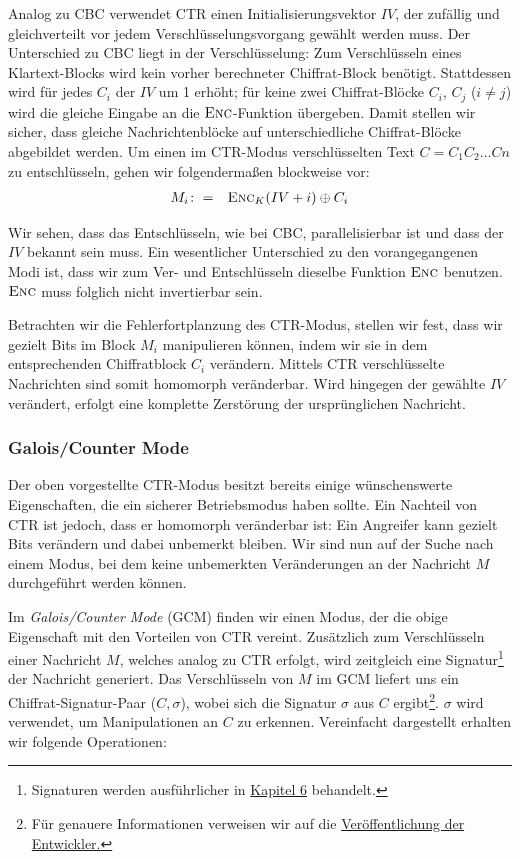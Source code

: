 Analog zu CBC verwendet CTR einen Initialisierungsvektor \(IV\), der zufällig und gleichverteilt vor jedem Verschlüsselungsvorgang gewählt werden muss. Der Unterschied zu CBC liegt in der Verschlüsselung: Zum Verschlüsseln eines Klartext-Blocks wird kein vorher berechneter Chiffrat-Block benötigt. Stattdessen wird für jedes \(C_i\) der \(IV\) um 1 erhöht; für keine zwei Chiffrat-Blöcke \(C_i\), \(C_j\) (\(i \neq j\)) wird die gleiche Eingabe an die \(\textsc{Enc}\)-Funktion übergeben. Damit stellen wir sicher, dass gleiche Nachrichtenblöcke auf unterschiedliche Chiffrat-Blöcke abgebildet werden. Um einen im CTR-Modus verschlüsselten Text \(C = C_1C_2 \dots Cn\) zu entschlüsseln, gehen wir folgendermaßen blockweise vor:
\begin{eqnarray*}
	M_i	& \colon=	& \textsc{Enc}_{K}(IV + i) \oplus C_i
\end{eqnarray*}

Wir sehen, dass das Entschlüsseln, wie bei CBC, parallelisierbar ist und dass der \(IV\) bekannt sein muss. Ein wesentlicher Unterschied zu den vorangegangenen Modi ist, dass wir zum Ver- und Entschlüsseln dieselbe Funktion \(\textsc{Enc}\) benutzen. \(\textsc{Enc}\) muss folglich nicht invertierbar sein.

Betrachten wir die Fehlerfortplanzung des CTR-Modus, stellen wir fest, dass wir gezielt Bits im Block \(M_i\) manipulieren können, indem wir sie in dem entsprechenden Chiffratblock \(C_i\) verändern. Mittels CTR verschlüsselte Nachrichten sind somit homomorph veränderbar. Wird hingegen der gewählte \(IV\) verändert, erfolgt eine komplette Zerstörung der ursprünglichen Nachricht. 

\subsubsection{Galois/Counter Mode}

Der oben vorgestellte CTR-Modus besitzt bereits einige wünschenswerte Eigenschaften, die ein sicherer Betriebsmodus haben sollte. Ein Nachteil von CTR ist jedoch, dass er homomorph veränderbar ist: Ein Angreifer kann gezielt Bits verändern und dabei unbemerkt bleiben. Wir sind nun auf der Suche nach einem Modus, bei dem keine unbemerkten Veränderungen an der Nachricht \(M\) durchgeführt werden können.

Im \textit{Galois/Counter Mode} (GCM) finden wir einen Modus, der die obige Eigenschaft mit den Vorteilen von CTR vereint. Zusätzlich zum Verschlüsseln einer Nachricht \(M\), welches analog zu CTR erfolgt, wird zeitgleich eine Signatur\footnote{Signaturen werden ausführlicher in \hyperref[cha6]{Kapitel 6} behandelt.} der Nachricht generiert. Das Verschlüsseln von \(M\) im GCM liefert uns ein Chiffrat-Signatur-Paar (\(C, \sigma\)), wobei sich die Signatur \(\sigma\) aus \(C\) ergibt\footnote{Für genauere Informationen verweisen wir auf die \href{http://csrc.nist.gov/groups/ST/toolkit/BCM/documents/proposedmodes/gcm/gcm-spec.pdf}{Veröffentlichung der Entwickler.}}. \(\sigma\) wird verwendet, um Manipulationen an \(C\) zu erkennen.
Vereinfacht dargestellt erhalten wir folgende Operationen:
\bigskip

